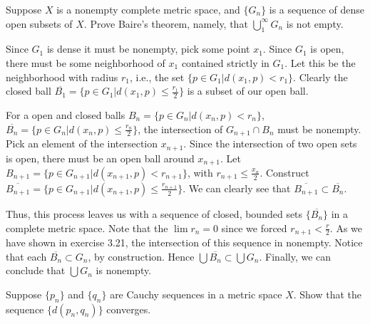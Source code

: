 \begin{problem}
  Suppose $X$ is a nonempty complete metric space, and $\{G_n\}$ is a sequence of dense open subsets of $X$.
  Prove Baire's theorem, namely, that $\bigcup_1^{\infty} G_n$ is not empty.
\end{problem}

\begin{solution}
  Since $G_1$ is dense it must be nonempty, pick some point $x_1$.
  Since $G_1$ is open, there must be some neighborhood of $x_1$ contained strictly in $G_1$.
  Let this be the neighborhood with radius $r_1$, i.e., the set $\{p \in G_1 | d(x_1, p) < r_1\}$.
  Clearly the closed ball $\overline{B_1} = \{p \in G_1 | d(x_1, p) \le \frac{r_1}{2}\}$ is a subset of our open ball.

  For a open and closed balls $B_n = \{p \in G_n | d(x_n, p) < r_n\}$, $\overline{B_n} = \{p \in G_n | d(x_n, p) \le \frac{r_n}{2}\}$, the intersection of $G_{n + 1} \cap B_n$ must be nonempty.
  Pick an element of the intersection $x_{n + 1}$.
  Since the intersection of two open sets is open, there must be an open ball around $x_{n + 1}$.
  Let $B_{n + 1} = \{p \in G_{n + 1} | d(x_{n + 1}, p) < r_{n + 1}\}$, with $r_{n + 1} \le \frac{x_n}{2}$.
  Construct $\overline{B_{n + 1}} = \{p \in G_{n + 1} | d(x_{n + 1}, p) \le \frac{r_{n + 1}}{2}\}$.
  We can clearly see that $\overline{B_{n + 1}} \subset \overline{B_n}$.

  Thus, this process leaves us with a sequence of closed, bounded sets $\{\overline{B_n}\}$ in a complete metric space.
  Note that the $\lim r_n = 0$ since we forced $r_{n + 1} < \frac{r}{2}$.
  As we have shown in exercise 3.21, the intersection of this sequence in nonempty.
  Notice that each $\overline{B_n} \subset G_n$, by construction.
  Hence $\bigcup \overline{B_n} \subset \bigcup G_n$.
  Finally, we can conclude that $\bigcup G_n$ is nonempty.
\end{solution}

\begin{problem}
  Suppose $\{p_n\}$ and $\{q_n\}$ are Cauchy sequences in a metric space $X$.
  Show that the sequence $\{d(p_n, q_n)\}$ converges.
\end{problem}

